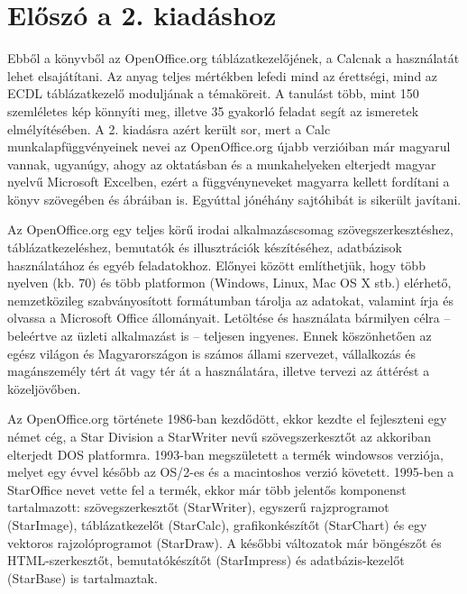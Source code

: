 \section*{Előszó a 2. kiadáshoz}
\thispagestyle{empty}
\small
Ebből a könyvből az OpenOffice.org táblázatkezelőjének, a Calcnak a használatát lehet elsajátítani. Az anyag teljes mértékben lefedi mind az érettségi, mind az ECDL táblázatkezelő moduljának a témaköreit. A tanulást több, mint 150 szemléletes kép könnyíti meg, illetve 35 gyakorló feladat segít az ismeretek elmélyítésében. A 2. kiadásra azért került sor, mert a Calc munkalapfüggvényeinek nevei az OpenOffice.org újabb verzióiban már magyarul vannak, ugyanúgy, ahogy az oktatásban és a munkahelyeken elterjedt magyar nyelvű Microsoft Excelben, ezért a függvényneveket magyarra kellett fordítani a könyv szövegében és ábráiban is. Egyúttal jónéhány sajtóhibát is sikerült javítani.

\smallskip

Az OpenOffice.org egy teljes körű irodai alkalmazáscsomag szövegszerkesztéshez, táblázatkezeléshez, bemutatók és illusztrációk készítéséhez, adatbázisok használatához és egyéb feladatokhoz. Előnyei között említhetjük, hogy több nyelven (kb. 70) és több platformon (Windows, Linux, Mac OS X stb.) elérhető, nemzetközileg szabványosított formátumban tárolja az adatokat, valamint írja és olvassa a Microsoft Office állományait. Letöltése és használata bármilyen célra – beleértve az üzleti alkalmazást is – teljesen ingyenes. Ennek köszönhetően az egész világon és Magyarországon is számos állami szervezet, vállalkozás és magánszemély tért át vagy tér át a használatára, illetve tervezi az áttérést a közeljövőben.

\smallskip

Az OpenOffice.org története 1986-ban kezdődött, ekkor kezdte el fejleszteni egy német cég, a Star Division a StarWriter nevű szövegszerkesztőt az akkoriban elterjedt DOS platformra. 1993-ban megszületett a termék windowsos verziója, melyet egy évvel később az OS/2-es és a macintoshos verzió követett. 1995-ben a StarOffice nevet vette fel a termék, ekkor már több jelentős komponenst tartalmazott: szövegszerkesztőt (StarWriter), egyszerű rajzprogramot (StarImage), táblázatkezelőt (StarCalc), grafikonkészítőt (StarChart) és egy vektoros rajzolóprogramot (StarDraw). A későbbi változatok már böngészőt és HTML-szerkesztőt, bemutatókészítőt (StarImpress) és adatbázis-kezelőt (StarBase) is tartalmaztak.

\smallskip


